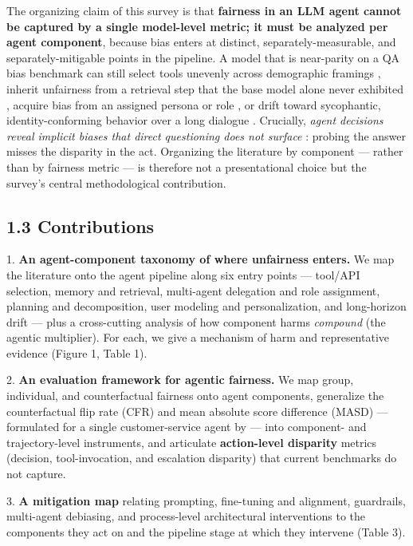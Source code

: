 \documentclass[sigconf,nonacm]{acmart}
\begin{document}
The organizing claim of this survey is that \textbf{fairness in an LLM agent cannot be captured by a single model-level metric; it must be analyzed per agent component}, because bias enters at distinct, separately-measurable, and separately-mitigable points in the pipeline. A model that is near-parity on a QA bias benchmark can still select tools unevenly across demographic framings \cite{blankenstein2025biasbusters}, inherit unfairness from a retrieval step that the base model alone never exhibited \cite{wu2024rag, hu2024free}, acquire bias from an assigned persona or role \cite{gupta2023bias, cao2026from}, or drift toward sycophantic, identity-conforming behavior over a long dialogue \cite{liu2025truth, ma2026implicit}. Crucially, \emph{agent decisions reveal implicit biases that direct questioning does not surface} \cite{li2025actions}: probing the answer misses the disparity in the act. Organizing the literature by component — rather than by fairness metric — is therefore not a presentational choice but the survey's central methodological contribution.

\subsection{1.3 Contributions}

1. \textbf{An agent-component taxonomy of where unfairness enters.} We map the literature onto the agent pipeline along six entry points — tool/API selection, memory and retrieval, multi-agent delegation and role assignment, planning and decomposition, user modeling and personalization, and long-horizon drift — plus a cross-cutting analysis of how component harms \emph{compound} (the agentic multiplier). For each, we give a mechanism of harm and representative evidence (Figure 1, Table 1).

2. \textbf{An evaluation framework for agentic fairness.} We map group, individual, and counterfactual fairness onto agent components, generalize the counterfactual flip rate (CFR) and mean absolute score difference (MASD) — formulated for a single customer-service agent by \cite{mayilvaghanan2026counterfactual} — into component- and trajectory-level instruments, and articulate \textbf{action-level disparity} metrics (decision, tool-invocation, and escalation disparity) that current benchmarks do not capture.

3. \textbf{A mitigation map} relating prompting, fine-tuning and alignment, guardrails, multi-agent debiasing, and process-level architectural interventions to the components they act on and the pipeline stage at which they intervene (Table 3).
\end{document}
